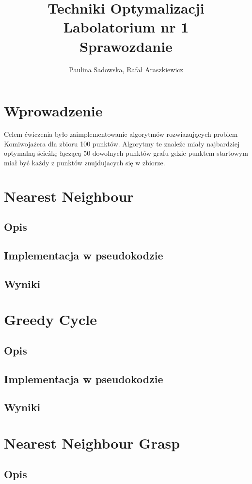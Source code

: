 \documentclass[a4paper 10pt]{article}
\title{\textbf{Techniki Optymalizacji} \\
Labolatorium nr 1 \\
Sprawozdanie}
\author{Paulina Sadowska, Rafał Araszkiewicz}
\begin{document}
\maketitle

\section{Wprowadzenie}
Celem ćwiczenia było zaimplementowanie algorytmów rozwiazujących problem Komiwojażera dla zbioru 100 punktów. Algorytmy te znaleźc miały najbardziej optymalną ścieżkę łączącą 50 dowolnych punktów grafu gdzie punktem startowym miał być każdy z punktów znujdujacych się w zbiorze.
\section{Nearest Neighbour}
\subsection{Opis}
\subsection{Implementacja w pseudokodzie}
\subsection{Wyniki}

\section{Greedy Cycle}
\subsection{Opis}
\subsection{Implementacja w pseudokodzie}
\subsection{Wyniki}

\section{Nearest Neighbour Grasp}
\subsection{Opis}
\end{document}
